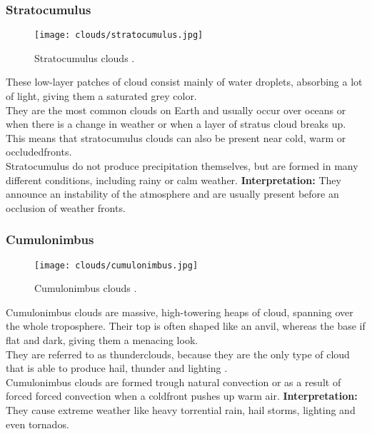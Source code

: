 \subsubsection{Stratocumulus}
\begin{wrapfigure}[10]{r}{6.3cm}
    \vspace{-\baselineskip}
    \texttt{[image: clouds/stratocumulus.jpg]}
    \caption{Stratocumulus clouds \protect\cite{cloudtypes:meteoblue}.}
    \label{img:clouds:stratocumulus}
\end{wrapfigure}
These low-layer patches of cloud consist mainly of water droplets, absorbing a lot of light, giving them a saturated grey color.
\\
They are the most common clouds on Earth and usually occur over oceans or when there is a change in weather or when a layer of stratus cloud breaks up.
This means that stratocumulus clouds can also be present near cold, warm or \gls{occludedfront}s.
\\
Stratocumulus do not produce \gls{precipitation} themselves, but are formed in many different conditions, including rainy or calm weather.
\emptyline
\textbf{Interpretation:}
They announce an instability of the atmosphere and are usually present before an occlusion of weather fronts.

\pagebreak

\subsubsection{Cumulonimbus}
\begin{wrapfigure}[10]{r}{6.3cm}
    \vspace{-\baselineskip}
    \texttt{[image: clouds/cumulonimbus.jpg]}
    \caption{Cumulonimbus clouds \protect\cite{cloudtypes:wiki:cumulonimbus}.}
    \label{img:clouds:cumulonimbus}
\end{wrapfigure}
Cumulonimbus clouds are massive, high-towering heaps of cloud, spanning over the whole troposphere.
Their top is often shaped like an anvil, whereas the base if flat and dark, giving them a menacing look.
\\
They are referred to as thunderclouds, because they are the only type of cloud that is able to produce hail, thunder and lighting \cite{metoffice:cumulonimbus}.
\\
Cumulonimbus clouds are formed trough natural \gls{convection} or as a result of forced forced \gls{convection} when a \gls{coldfront} pushes up warm air.
\emptyline
\textbf{Interpretation:}
They cause extreme weather like heavy torrential rain, hail storms, lighting and even tornados.